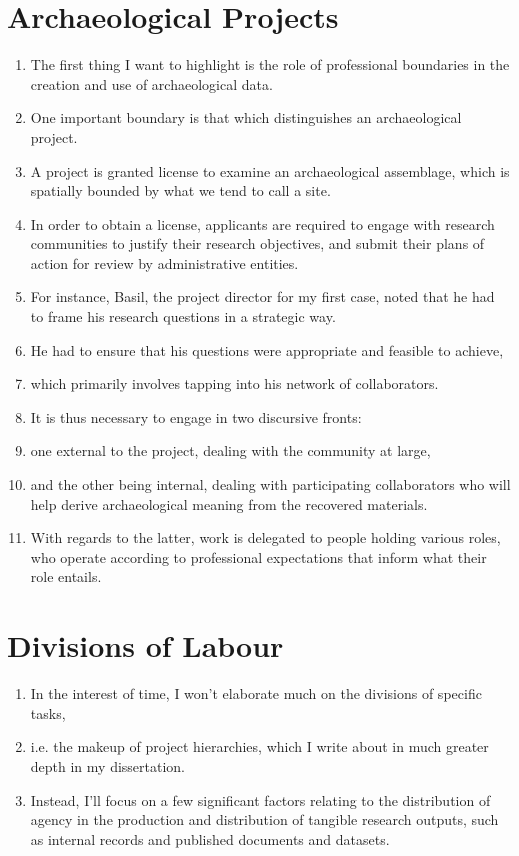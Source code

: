 \documentclass{article}
\begin{document}
\section{Archaeological Projects}
\begin{enumerate}
  \item The first thing I want to highlight is the role of professional boundaries in the creation and use of archaeological data.
  \item One important boundary is that which distinguishes an archaeological project.
  \item A project is granted license to examine an archaeological assemblage, which is spatially bounded by what we tend to call a site.
  \item In order to obtain a license, applicants are required to engage with research communities to justify their research objectives, and submit their plans of action for review by administrative entities.
  \item For instance, Basil, the project director for my first case, noted that he had to frame his research questions in a strategic way.
  \item He had to ensure that his questions were appropriate and feasible to achieve,
  \item which primarily involves tapping into his network of collaborators.
  \item It is thus necessary to engage in two discursive fronts:
  \item one external to the project, dealing with the community at large,
  \item and the other being internal, dealing with participating collaborators who will help derive archaeological meaning from the recovered materials.
  \item With regards to the latter, work is delegated to people holding various roles, who operate according to professional expectations that inform what their role entails.

\end{enumerate}

\section{Divisions of Labour}
\begin{enumerate}
  \item In the interest of time, I won't elaborate much on the divisions of specific tasks,
  \item i.e. the makeup of project hierarchies, which I write about in much greater depth in my dissertation.
  \item Instead, I'll focus on a few significant factors relating to the distribution of agency in the production and distribution of tangible research outputs, such as internal records and published documents and datasets.
\end{enumerate}
  
\end{document}

